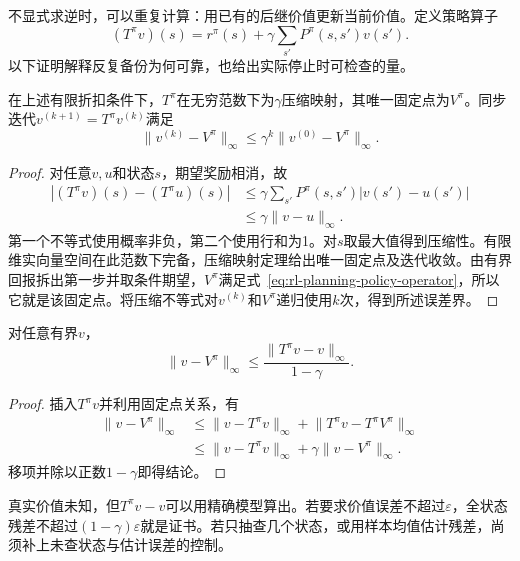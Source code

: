 不显式求逆时，可以重复计算：用已有的后继价值更新当前价值。定义策略算子
\begin{equation}
 (T^\pi v)(s)=r^\pi(s)+\gamma\sum_{s'}P^\pi(s,s')v(s').
 \label{eq:rl-planning-policy-operator}
\end{equation}
以下证明解释反复备份为何可靠，也给出实际停止时可检查的量。

\begin{theorem}[策略评价的压缩性与收敛]
 \label{thm:rl-planning-policy-contraction}
 在上述有限折扣条件下，$T^\pi$在无穷范数下为$\gamma$压缩映射，其唯一固定点为$V^\pi$。同步迭代$v^{(k+1)}=T^\pi v^{(k)}$满足
 \[
 \lVert v^{(k)}-V^\pi\rVert_\infty
 \leq\gamma^k\lVert v^{(0)}-V^\pi\rVert_\infty.
 \]
\end{theorem}
\begin{proof}
 对任意$v,u$和状态$s$，期望奖励相消，故
 \[
 \begin{aligned}
 |(T^\pi v)(s)-(T^\pi u)(s)|
 &\leq\gamma\sum_{s'}P^\pi(s,s')|v(s')-u(s')|\\
 &\leq\gamma\lVert v-u\rVert_\infty.
 \end{aligned}
 \]
 第一个不等式使用概率非负，第二个使用行和为1。对$s$取最大值得到压缩性。有限维实向量空间在此范数下完备，压缩映射定理给出唯一固定点及迭代收敛。由有界回报拆出第一步并取条件期望，$V^\pi$满足式~\eqref{eq:rl-planning-policy-operator}，所以它就是该固定点。将压缩不等式对$v^{(k)}$和$V^\pi$递归使用$k$次，得到所述误差界。
\end{proof}

\begin{theorem}[评价残差证书]
 \label{thm:rl-planning-evaluation-residual}
 对任意有界$v$，
 \begin{equation}
 \lVert v-V^\pi\rVert_\infty
 \leq\frac{\lVert T^\pi v-v\rVert_\infty}{1-\gamma}.
 \label{eq:rl-planning-evaluation-residual}
 \end{equation}
\end{theorem}
\begin{proof}
 插入$T^\pi v$并利用固定点关系，有
 \[
 \begin{aligned}
 \lVert v-V^\pi\rVert_\infty
 &\leq\lVert v-T^\pi v\rVert_\infty+
       \lVert T^\pi v-T^\pi V^\pi\rVert_\infty\\
 &\leq\lVert v-T^\pi v\rVert_\infty+
       \gamma\lVert v-V^\pi\rVert_\infty.
 \end{aligned}
 \]
 移项并除以正数$1-\gamma$即得结论。
\end{proof}

真实价值未知，但$T^\pi v-v$可以用精确模型算出。若要求价值误差不超过$\varepsilon$，全状态残差不超过$(1-\gamma)\varepsilon$就是证书。若只抽查几个状态，或用样本均值估计残差，尚须补上未查状态与估计误差的控制。

